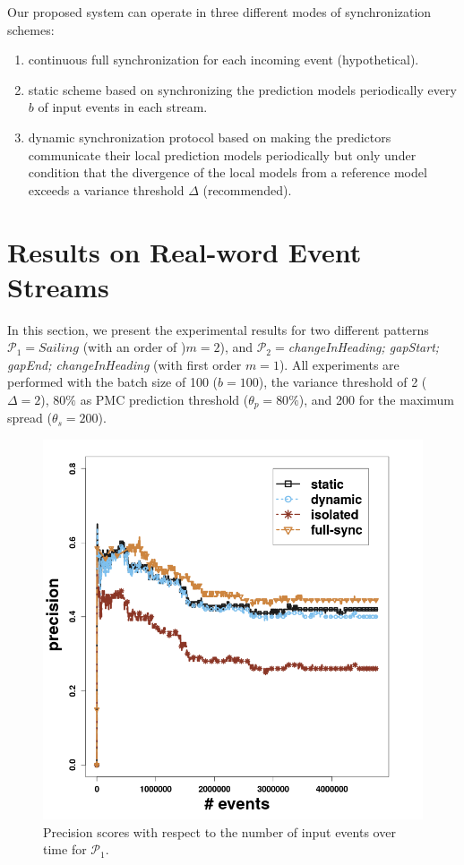 Our proposed system can operate in three different modes of synchronization schemes: \begin{enumerate}[label=(\roman*)] 
	\item continuous full synchronization for each incoming event (hypothetical).
	\item static scheme based on synchronizing the prediction models periodically every $b$ of input events in each stream.
	\item dynamic synchronization protocol based on making the predictors communicate their local prediction models periodically but only under condition that the divergence of the local models from a reference model exceeds a variance threshold $\Delta$ (recommended).  	   
	
\end{enumerate}



\section{Results on Real-word Event Streams}
\label{sec:results_real}

In this section, we present the experimental results for two different patterns  $\mathcal{P}_1=Sailing$ (with an order of )$m=2$), and   $\mathcal{P}_2=$\textit{changeInHeading; gapStart; gapEnd; changeInHeading} (with first order $m=1$). All experiments are performed with the batch size of 100  ($b=100$), the variance threshold of 2 ($\Delta=2$), $80\%$ as PMC prediction threshold ($\theta_{p}=80\%$), and 200 for the maximum spread ($\theta_{s}=200$).

\begin{figure}[H]
	\centering
	\includegraphics[width=\textwidth,height=.62\textheight]{chapters/figures/synopses/p1_precision_100_2_08.png}
	
	\caption{Precision scores with respect to the number of input events over time for $\mathcal{P}_1$.}
	\label{fig:precsions}
\end{figure}

